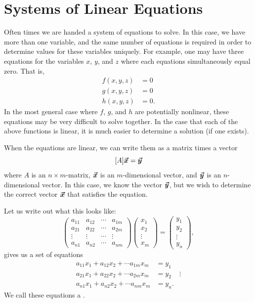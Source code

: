         \section{Systems of Linear Equations}
        Often times we are handed a system of equations to solve.  In this case, we have more than one variable, and the same number of equations is required in order to determine values for these variables uniquely. For example, one may have three equations for the variables $x$, $y$, and $z$ where each equations simultaneously equal zero. That is,
        \begin{align*}
            f(x,y,z) &= 0\\
            g(x,y,z) &= 0\\
            h(x,y,z) &= 0.
        \end{align*}
        In the most general case where $f$, $g$, and $h$ are potentially nonlinear, these equations may be very difficult to solve together.  In the case that each of the above functions is linear, it is much easier to determine a solution (if one exists).
        
        When the equations are linear, we can write them as a matrix times a vector
        \[
        [A]\boldsymbol{\boldsymbol{\vec{x}}}=\boldsymbol{\boldsymbol{\vec{y}}}
        \]
        where $A$ is an $n\times m$-matrix, $\boldsymbol{\boldsymbol{\vec{x}}}$ is an $m$-dimensional vector, and $\boldsymbol{\boldsymbol{\vec{y}}}$ is an $n$-dimensional vector. In this case, we know the vector $\boldsymbol{\boldsymbol{\vec{y}}}$, but we wish to determine the correct vector $\boldsymbol{\boldsymbol{\vec{x}}}$ that satisfies the equation. 
        
        Let us write out what this looks like:
        \[
        \begin{pmatrix}
        a_{11} & a_{12} & \cdots & a_{1m}\\
        a_{21} & a_{22} & \cdots & a_{2m}\\
        \vdots & \vdots & \cdots & \vdots\\
        a_{n1} & a_{n2} & \cdots & a_{nm}
        \end{pmatrix}
        \begin{pmatrix}
        x_1\\ x_2 \\ \vdots \\ x_m
        \end{pmatrix}
        =\begin{pmatrix}
        y_1 \\ y_2 \\ \vdots \\ y_n
        \end{pmatrix},
        \]
        gives us a set of equations
        \begin{align*}
        a_{11} x_1 + a_{12}x_2 + \cdots a_{1m} x_m &= y_1\\
        a_{21} x_1 + a_{22} x_2 + \cdots a_{2m} x_m &= y_2
        &\vdots\\
        a_{n1} x_1 + a_{n2} x_2 + \cdots a_{nm} x_m &= y_n.
        \end{align*}
        We call these equations a .
        
